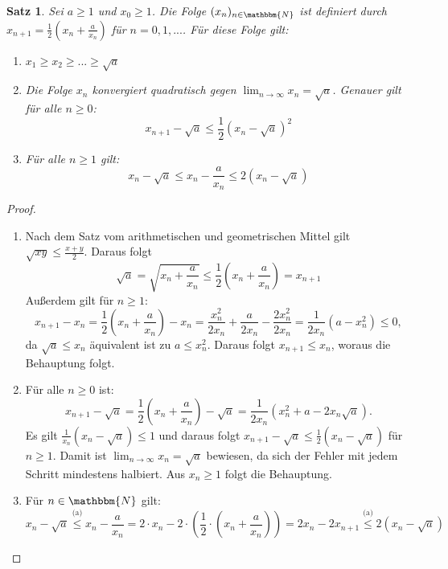 \documentclass[12pt]{article}
\newcommand{\N}{\mathbbm{N}} %
\newtheorem{satz}{Satz}[section]
\begin{document}
\begin{satz}
    Sei $a \geq 1$ und $x_0 \geq 1$. Die Folge $(x_n)_{n \in \N}$ ist definiert durch $x_{n+1}= \frac{1}{2}\left(x_n+ \frac{a}{x_n}\right)$ für $n=0,1,...$. Für diese Folge gilt:
    \begin{enumerate}[label=(\alph*)]
        \item $x_1 \geq x_2 \geq ... \geq \sqrt{a}$
        \item Die Folge $x_n$ konvergiert quadratisch gegen $\lim_{n \to \infty} x_n= \sqrt{a}$. Genauer gilt für alle $n \geq0$:
        \begin{equation*}
            x_{n+1}- \sqrt{a} \leq \frac{1}{2}(x_n-\sqrt{a})^2
        \end{equation*}
        \item Für alle $n \geq 1$ gilt:
        \begin{equation*}
            x_n- \sqrt{a} \leq x_n - \frac{a}{x_n} \leq 2(x_n- \sqrt{a})
        \end{equation*}
    \end{enumerate}
\end{satz}
\begin{proof} 
    \begin{enumerate}[label=(\alph*)]
        \item Nach dem Satz vom arithmetischen und geometrischen Mittel gilt $\sqrt{xy} \leq \frac{x+y}{2}$. Daraus folgt
        \begin{equation*}
            \sqrt{a}= \sqrt{x_n+\frac{a}{x_n}} \leq \frac{1}{2} \left(x_n + \frac{a}{x_n}\right)=x_{n+1}
        \end{equation*}
        Außerdem gilt für $n\geq 1$:
        \begin{equation*}
            x_{n+1}-x_n= \frac{1}{2} \left(x_n+ \frac{a}{x_n} \right)-x_n= \frac{x_n^2}{2x_n}+ \frac{a}{2x_n}- \frac{2x_n^2}{2x_n}= \frac{1}{2x_n}(a-x_n^2)\leq0,
        \end{equation*}
        da $\sqrt{a} \leq x_n$ äquivalent ist zu $a \leq x_n^2$. Daraus folgt $x_{n+1} \leq x_n$, woraus die Behauptung folgt.
        \item Für alle $n \geq 0$ ist:
        \begin{equation*}
            x_{n+1}-\sqrt{a}= \frac{1}{2} \left(x_n+ \frac{a}{x_n} \right)- \sqrt{a} = \frac{1}{2x_n}(x_n^2+a-2x_n\sqrt{a}).
        \end{equation*}
        Es gilt $\frac{1}{x_n}(x_n-\sqrt{a})\leq 1$ und daraus folgt $x_{n+1}-\sqrt{a} \leq \frac{1}{2}(x_n-\sqrt{a})$ für $n \geq1$. Damit ist $\lim_{n \to \infty} x_n = \sqrt{a}$ bewiesen, da sich der Fehler mit jedem Schritt mindestens halbiert. Aus $x_n \geq 1$ folgt die Behauptung.
        \item Für $n \in \N$ gilt:
        \begin{equation*}
            x_n-\sqrt{a} \overset{\text{(a)}}{\leq} x_n- \frac{a}{x_n}= 2 \cdot x_n - 2 \cdot \left( \frac{1}{2} \cdot  \left( x_n + \frac{a}{x_n}\right) \right) = 2x_n-2x_{n+1} \overset{\text{(a)}}{\leq} 2(x_n- \sqrt{a}) 
        \end{equation*} 
    \end{enumerate}
\end{proof}
\end{document}
